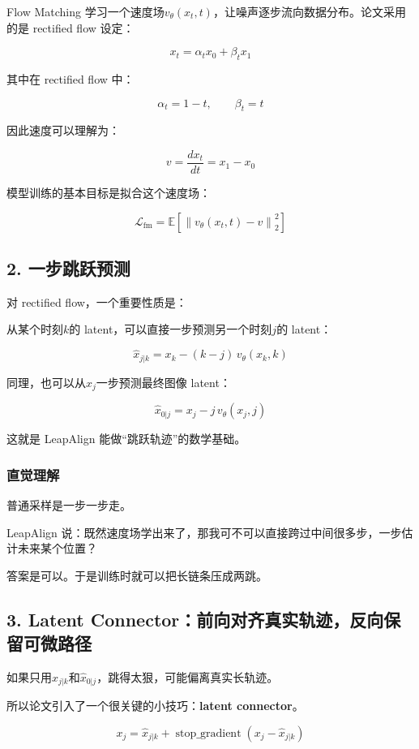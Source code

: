 Flow Matching 学习一个速度场$v_\theta(x_t, t)$，让噪声逐步流向数据分布。论文采用的是 rectified flow 设定：

\[
x_t = \alpha_t x_0 + \beta_t x_1
\]

其中在 rectified flow 中：

\[
\alpha_t = 1 - t,\qquad \beta_t = t
\]

因此速度可以理解为：

\[
v = \frac{dx_t}{dt} = x_1 - x_0
\]

模型训练的基本目标是拟合这个速度场：

\[
\mathcal{L}_{\mathrm{fm}}
=
\mathbb{E}\left[\left\|v_\theta(x_t, t) - v\right\|_2^2\right]
\]

\subsection{2. 一步跳跃预测}

对 rectified flow，一个重要性质是：

从某个时刻$k$的 latent，可以直接一步预测另一个时刻$j$的 latent：

\[
\hat{x}_{j|k} = x_k - (k-j)\, v_\theta(x_k, k)
\]

同理，也可以从$x_j$一步预测最终图像 latent：

\[
\hat{x}_{0|j} = x_j - j\, v_\theta(x_j, j)
\]

这就是 LeapAlign 能做“跳跃轨迹”的数学基础。

\subsubsection{直觉理解}

普通采样是一步一步走。

LeapAlign 说：既然速度场学出来了，那我可不可以直接跨过中间很多步，一步估计未来某个位置？

答案是可以。于是训练时就可以把长链条压成两跳。

\subsection{3. Latent Connector：前向对齐真实轨迹，反向保留可微路径}

如果只用$\hat{x}_{j|k}$和$\hat{x}_{0|j}$，跳得太狠，可能偏离真实长轨迹。

所以论文引入了一个很关键的小技巧：\textbf{latent connector}。

\[
x_j
=
\hat{x}_{j|k}
+
\operatorname{stop\_gradient}(x_j - \hat{x}_{j|k})
\]

